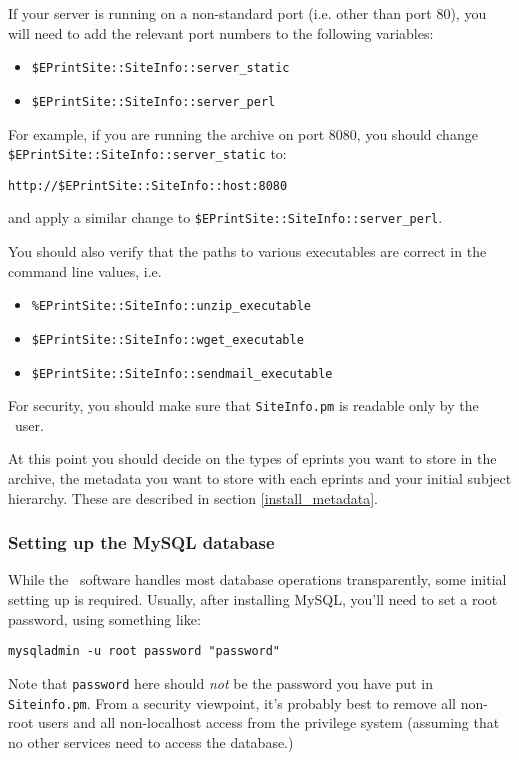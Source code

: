 If your server is running on a non-standard port (i.e. other than port 80), you will need to add the relevant port numbers to the following variables:

\begin{itemize}
\item {\tt \$EPrintSite::SiteInfo::server\_static}
\item {\tt \$EPrintSite::SiteInfo::server\_perl}
\end{itemize}

For example, if you are running the archive on port 8080, you should change {\tt \$EPrintSite::SiteInfo::server\_static} to:

{\tt http://\$EPrintSite::SiteInfo::host:8080}

and apply a similar change to {\tt \$EPrintSite::SiteInfo::server\_perl}.

You should also verify that the paths to various executables are correct in the command line values, i.e.

\begin{itemize}
\item {\tt \%EPrintSite::SiteInfo::unzip\_executable}
\item {\tt \$EPrintSite::SiteInfo::wget\_executable}
\item {\tt \$EPrintSite::SiteInfo::sendmail\_executable}
\end{itemize}

For security, you should make sure that {\tt SiteInfo.pm} is readable only by the \eprints\ user.

At this point you should decide on the types of eprints you want to store in the archive, the metadata you want to store with each eprints and your initial subject hierarchy. These are described in section \ref{install_metadata}.


\subsubsection{Setting up the MySQL database}
\label{manual_create_db}

While the \eprints\ software handles most database operations transparently, some initial setting up is required. Usually, after installing MySQL, you'll need to set a root password, using something like:

\begin{verbatim}
mysqladmin -u root password "password"
\end{verbatim}

Note that {\tt password} here should \emph{not} be the password you have put in {\tt Siteinfo.pm}. From a security viewpoint, it's probably best to remove all non-root users and all non-localhost access from the privilege system (assuming that no other services need to access the database.)

